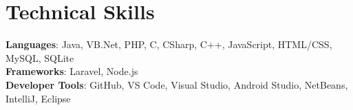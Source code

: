 \documentclass[letterpaper,11pt]{article}
\begin{document}
%
\section{Technical Skills}
 \begin{itemize}[leftmargin=0.15in, label={}]
    \small{\item{
     \textbf{Languages}{: Java, VB.Net, PHP, C, CSharp, C++, JavaScript, HTML/CSS, MySQL, SQLite} \\
     \textbf{Frameworks}{: Laravel, Node.js} \\
     \textbf{Developer Tools}{: GitHub, VS Code, Visual Studio, Android Studio, NetBeans, IntelliJ, Eclipse} \\
    }}
 \end{itemize}


\end{document}
